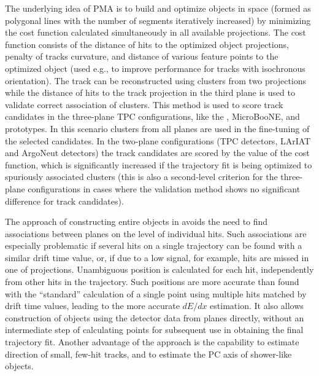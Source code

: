 The underlying idea of PMA is to build and optimize objects in \threed space (formed as polygonal lines with %
the number of segments iteratively increased) by minimizing the cost function calculated simultaneously in all available \twod projections. The cost function consists of the \twod distance of hits to the optimized object \twod projections, penalty of tracks curvature, and \threed distance of various feature points to the optimized object (used e.g., to improve performance for tracks with isochronous orientation).
 The track can be reconstructed using clusters from two projections while the distance of hits to the track projection in the third plane is used to validate correct association of clusters. This method is used to score \threed track candidates in the three-plane TPC configurations, like the , %
MicroBooNE, %
and prototypes. In this scenario clusters from all planes are used in the fine-tuning of the selected candidates. In the two-plane configurations (\dual TPC detectors, \single LArIAT and ArgoNeut  detectors) the track candidates are scored by the value of the cost function, which is significantly increased if the trajectory fit is being optimized to spuriously associated clusters
 (this is also a second-level criterion for the three-plane configurations %
 in cases where the validation method shows no significant difference for track candidates).


The approach of constructing entire objects in \threed %
avoids the need to find associations between \twod planes on the level of individual hits. Such associations are especially problematic if several hits on a single trajectory can be found with a similar drift time value, or, if  due to a low signal, for example, %
hits are missed in one of projections. Unambiguous \threed position is calculated for each \twod hit, independently from other hits in the trajectory. Such \threed positions are more accurate than found with the ``standard'' calculation of a single \threed point using multiple \twod hits matched by drift time values, leading to the more accurate $dE/dx$ estimation. It also allows %
construction of \threed objects using the detector data from \twod planes directly, without an intermediate step of %
calculating \threed points for subsequent use in obtaining the final trajectory fit. Another advantage of the approach is the capability to estimate direction of small, few-hit tracks, %
and to estimate the \threed PC axis of shower-like objects. 

